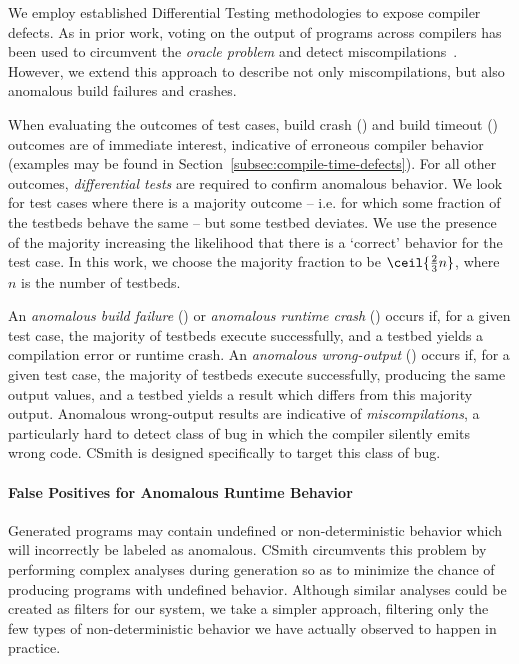 We employ established Differential Testing methodologies to expose compiler
defects. As in prior work, voting on the output of programs across compilers has
been used to circumvent the \emph{oracle problem} and detect
miscompilations~\cite{McKeeman1998}. However, we extend this approach to
describe not only miscompilations, but also anomalous build failures and
crashes.

When evaluating the outcomes of test cases, build crash (\bc) and build timeout
(\bto) outcomes are of immediate interest, indicative of erroneous compiler
behavior (examples may be found in Section~\ref{subsec:compile-time-defects}).
For all other outcomes, \emph{differential tests} are required to confirm
anomalous behavior. We look for test cases where there is a majority outcome --
i.e. for which some fraction of the testbeds behave the same -- but some testbed
deviates. We use the presence of the majority increasing the likelihood that
there is a `correct' behavior for the test case. In this work, we choose the
majority fraction to be $\ceil{\frac{2}{3}n}$, where $n$ is the number of
testbeds.

An \emph{anomalous build failure} (\abf) or \emph{anomalous runtime crash}
(\arc) occurs if, for a given test case, the majority of testbeds execute
successfully, and a testbed yields a compilation error or runtime crash. An
\emph{anomalous wrong-output} (\awo) occurs if, for a given test case, the
majority of testbeds execute successfully, producing the same output values, and
a testbed yields a result which differs from this majority output. Anomalous
wrong-output results are indicative of \emph{miscompilations}, a particularly
hard to detect class of bug in which the compiler silently emits wrong code.
CSmith is designed specifically to target this class of bug.

\paragraph{False Positives for Anomalous Runtime Behavior}%
\label{subsec:discussions}

Generated programs may contain undefined or non-deterministic behavior which
will incorrectly be labeled as anomalous. CSmith circumvents this problem by
performing complex analyses during generation so as to minimize the chance of
producing programs with undefined behavior. Although similar analyses could be
created as filters for our system, we take a simpler approach, filtering only
the few types of non-deterministic behavior we have actually observed to happen
in practice.


